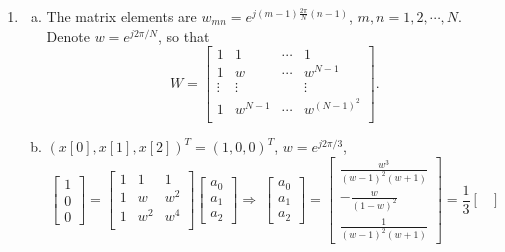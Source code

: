 \documentclass{article}
\begin{document}
\begin{enumerate}
            \item 
            \begin{enumerate}[(a)]
                \item The matrix elements are $w_{mn} = e^{j(m - 1) \frac{2\pi}{N} (n - 1)}$, $m, n = 1, 2, \cdots , N$. Denote $w = e^{j 2\pi / N}$, so that \[
                    W = \begin{bmatrix}
                        1 & 1 & \cdots & 1 \\
                        1 & w & \cdots & w^{N - 1}  \\
                        \vdots & \vdots &  & \vdots  \\
                        1 & w^{N-1} & \cdots & w^{(N - 1)^2}  \\
                    \end{bmatrix}.
                \]
                \item $(x[0], x[1], x[2])^T = (1, 0, 0)^T$, $w = e^{j 2\pi / 3}$, \[
                    \begin{bmatrix}
                        1 \\ 0 \\ 0
                    \end{bmatrix}
                    = \begin{bmatrix}
                        1 & 1 & 1 \\
                        1 & w & w^2 \\
                        1 & w^2 & w^4 \\
                    \end{bmatrix}
                    \begin{bmatrix} 
                        a_0 \\ a_1 \\ a_2
                    \end{bmatrix}
                    \Rightarrow\ 
                    \begin{bmatrix} 
                        a_0 \\ a_1 \\ a_2
                    \end{bmatrix}
                    = \begin{bmatrix} 
                        \frac{w^3}{(w-1)^2(w+1)} \\ -\frac{w}{(1-w)^2} \\ \frac{1}{(w-1)^2(w+1)}
                    \end{bmatrix}
                    = \frac{1}{3}\begin{bmatrix} 

\end{bmatrix}\]
\end{enumerate}
\end{enumerate}
\end{document}
